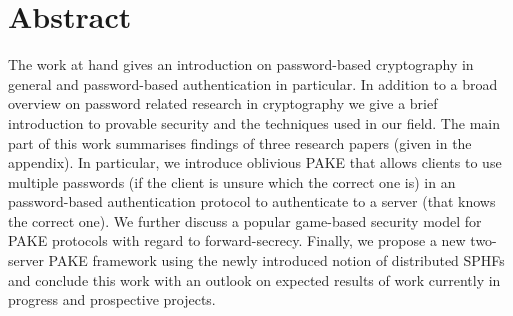 \cleardoublepage

\chapter*{Abstract}
The work at hand gives an introduction on password-based cryptography in general and password-based authentication in particular.
In addition to a broad overview on password related research in cryptography we give a brief introduction to provable security and the techniques used in our field.
The main part of this work summarises findings of three research papers (given in the appendix).
In particular, we introduce oblivious \ac{PAKE} that allows clients to use multiple passwords (if the client is unsure which the correct one is) in an password-based authentication protocol to authenticate to a server (that knows the correct one).
We further discuss a popular game-based security model for \ac{PAKE} protocols with regard to forward-secrecy.
Finally, we propose a new two-server \ac{PAKE} framework using the newly introduced notion of distributed \aclp{SPHF} and conclude this work with an outlook on expected results of work currently in progress and prospective projects.

\vfill
